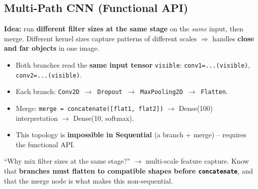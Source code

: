 \documentclass[10pt,a4paper]{article}
\begin{document}
	\subsection{Multi-Path CNN (Functional API)}

	\begin{definitionbox}
		\textbf{Idea:} run \textbf{different filter sizes at the same stage} on the \emph{same} input, then merge. Different kernel sizes capture patterns of different scales $\Rightarrow$ handles \textbf{close and far objects} in one image.
	\end{definitionbox}

	\begin{center}
	\end{center}

	\begin{itemize}[leftmargin=*]
		\item Both branches read the \textbf{same input tensor} \texttt{visible}: \texttt{conv1=...(visible)}, \texttt{conv2=...(visible)}.
		\item Each branch: \texttt{Conv2D $\to$ Dropout $\to$ MaxPooling2D $\to$ Flatten}.
		\item Merge: \texttt{merge = concatenate([flat1, flat2])} $\to$ Dense(100) interpretation $\to$ Dense(10, softmax).
		\item This topology is \textbf{impossible in Sequential} (a branch + merge) -- requires the functional API.
	\end{itemize}

	\begin{examtipbox}
		``Why mix filter sizes at the same stage?'' $\to$ multi-scale feature capture. Know that \textbf{branches must flatten to compatible shapes before \texttt{concatenate}}, and that the merge node is what makes this non-sequential.
	\end{examtipbox}
\end{document}
